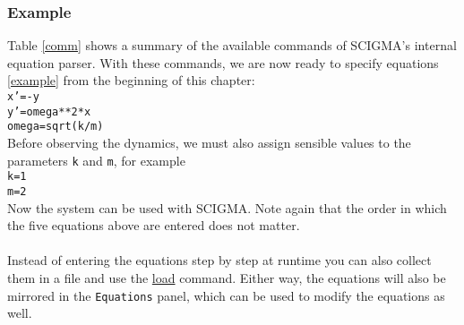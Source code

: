 \documentclass[10pt,a4paper,titlepage]{article}
\newcommand{\HL}[1]{\hyperlink{#1}{#1}}
\newcommand{\T}[1]{\texttt{#1}}
\begin{document}
\subsubsection*{Example}
Table \ref{comm} shows a summary of the available commands of SCIGMA's internal equation parser. With these commands, we are now ready to specify equations \eqref{example} from the beginning of this chapter:\\
\T{x'=-y}\\
\T{y'=omega**2*x}\\
\T{omega=sqrt(k/m)}\\
Before observing the dynamics, we must also assign sensible values to the parameters \T{k} and \T{m}, for example\\
\T{k=1}\\
\T{m=2}\\
Now the system can be used with SCIGMA. Note again that the order in which the five equations above are entered does not matter.\\\\ 
Instead of entering the equations step by step at runtime you can also collect them in a file and use the \HL{load} command. 
Either way, the equations will also be mirrored in the \T{Equations} panel, which can be used to modify the equations as well.
\end{document}
